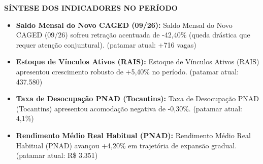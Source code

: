 \documentclass[10pt,a4paper]{article}
\begin{document}
{\begin{tikzpicture}[baseline=(box.base)]
\end{tikzpicture}\hfill%
%
}


\vspace{0.10cm}

\par\vspace{0.05cm}
\par\vspace{4pt}
{\fontsize{7.8}{9.4}\selectfont\bfseries\color{corprimaria}\MakeUppercase{Síntese dos Indicadores no Período}}\par\vspace{2pt}
{\scriptsize\color{cinzatexto}
\begin{itemize}[leftmargin=10pt, itemsep=1.2pt, topsep=1pt, parsep=0pt]
   \item \textbf{\color{corprimaria}Saldo Mensal do Novo CAGED (09/26):} Saldo Mensal do Novo CAGED (09/26) sofreu retração acentuada de -42,40\% (queda drástica que requer atenção conjuntural). (patamar atual: +716 vagas)
   \item \textbf{\color{corprimaria}Estoque de Vínculos Ativos (RAIS):} Estoque de Vínculos Ativos (RAIS) apresentou crescimento robusto de +5,40\% no período. (patamar atual: 437.580)
   \item \textbf{\color{corprimaria}Taxa de Desocupação PNAD (Tocantins):} Taxa de Desocupação PNAD (Tocantins) apresentou acomodação negativa de -0,30\%. (patamar atual: 4,1\%)
   \item \textbf{\color{corprimaria}Rendimento Médio Real Habitual (PNAD):} Rendimento Médio Real Habitual (PNAD) avançou +4,20\% em trajetória de expansão gradual. (patamar atual: R\$ 3.351)
\end{itemize}
}
\par\vspace{0.05cm}
\end{document}
